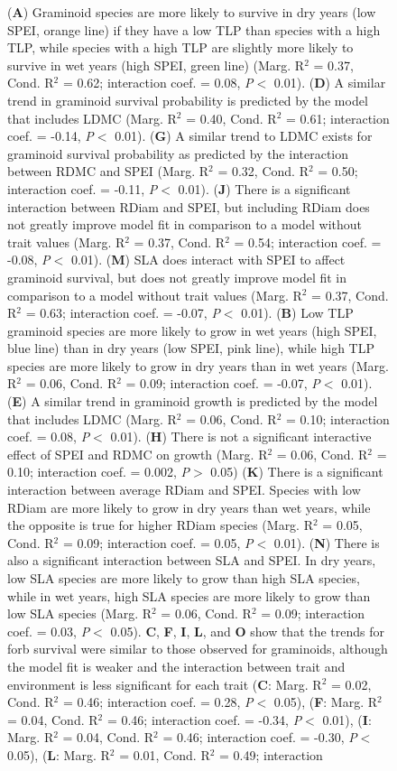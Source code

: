 \documentclass[12pt, letterpaper]{article}
\begin{document}
\begin{figure}
   \ContinuedFloat
   \caption{
(\textbf{A}) Graminoid species are more likely to survive in dry years (low SPEI, orange line) if they have a low TLP than species with a high TLP, while species with a high TLP are slightly more likely to survive in wet years (high SPEI, green line) (Marg. R$^2$ = 0.37, Cond. R$^2$ = 0.62; interaction coef. = 0.08, \textit{P}$<$ 0.01). (\textbf{D}) A similar trend in graminoid survival probability is predicted by the model that includes LDMC (Marg. R$^2$ = 0.40, Cond. R$^2$ = 0.61; interaction coef. = -0.14, \textit{P}$<$ 0.01). (\textbf{G}) A similar trend to LDMC exists for graminoid survival probability as predicted by the interaction between RDMC and SPEI (Marg. R$^2$ = 0.32, Cond. R$^2$ = 0.50; interaction coef. = -0.11, \textit{P}$<$ 0.01). (\textbf{J}) There is a significant interaction between RDiam and SPEI, but including RDiam does not greatly improve model fit in comparison to a model without trait values (Marg. R$^2$ = 0.37, Cond. R$^2$ = 0.54; interaction coef. = -0.08, \textit{P}$<$ 0.01). (\textbf{M}) SLA does interact with SPEI to affect graminoid survival, but does not greatly improve model fit in comparison to a model without trait values (Marg. R$^2$ = 0.37, Cond. R$^2$ = 0.63; interaction coef. = -0.07, \textit{P}$<$ 0.01). (\textbf{B}) Low TLP graminoid species are more likely to grow in wet years (high SPEI, blue line) than in dry years (low SPEI, pink line), while high TLP species are more likely to grow in dry years than in wet years (Marg. R$^2$ = 0.06, Cond. R$^2$ = 0.09; interaction coef. = -0.07, \textit{P}$<$ 0.01). (\textbf{E}) A similar trend in graminoid growth is predicted by the model that includes LDMC (Marg. R$^2$ = 0.06, Cond. R$^2$ = 0.10; interaction coef. = 0.08, \textit{P}$<$ 0.01). (\textbf{H}) There is not a significant interactive effect of SPEI and RDMC on growth (Marg. R$^2$ = 0.06, Cond. R$^2$ = 0.10; interaction coef. = 0.002, \textit{P}$>$ 0.05) (\textbf{K}) There is a significant interaction between average RDiam and SPEI. Species with low RDiam are more likely to grow in dry years than wet years, while the opposite is true for higher RDiam species (Marg. R$^2$ = 0.05, Cond. R$^2$ = 0.09; interaction coef. = 0.05, \textit{P}$<$ 0.01). (\textbf{N}) There is also a significant interaction between SLA and SPEI. In dry years, low SLA species are more likely to grow than high SLA species, while in wet years, high SLA species are more likely to grow than low SLA species (Marg. R$^2$ = 0.06, Cond. R$^2$ = 0.09; interaction coef. = 0.03, \textit{P}$<$ 0.05). \textbf{C}, \textbf{F}, \textbf{I}, \textbf{L}, and \textbf{O} show that the trends for forb survival were similar to those observed for graminoids, although the model fit is weaker and the interaction between trait and environment is less significant for each trait (\textbf{C}: Marg. R$^2$ = 0.02, Cond. R$^2$ = 0.46; interaction coef. = 0.28, \textit{P}$<$ 0.05), (\textbf{F}: Marg. R$^2$ = 0.04, Cond. R$^2$ = 0.46; interaction coef. = -0.34, \textit{P}$<$ 0.01), (\textbf{I}: Marg. R$^2$ = 0.04, Cond. R$^2$ = 0.46; interaction coef. = -0.30, \textit{P}$<$0.05), (\textbf{L}: Marg. R$^2$ = 0.01, Cond. R$^2$ = 0.49; interaction }
\end{figure}
\end{document}
